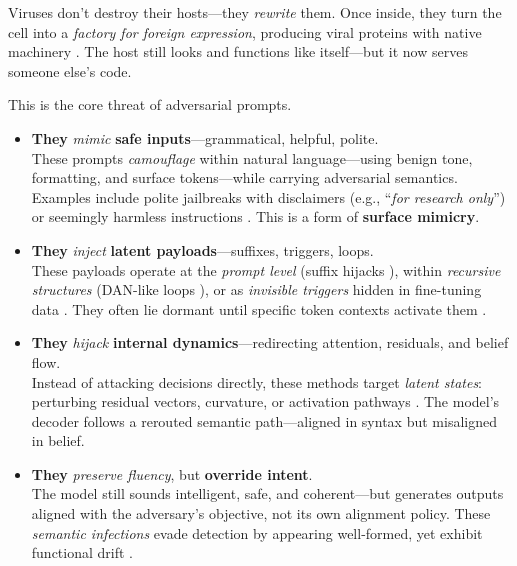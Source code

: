 
Viruses don’t destroy their hosts—they \emph{rewrite} them. Once inside, they turn the cell into a \textit{factory for foreign expression}, producing viral proteins with native machinery \cite{cohen2000control, tripathi2015host}. The host still looks and functions like itself—but it now serves someone else’s code.

This is the core threat of adversarial prompts.

\begin{itemize}[leftmargin=1em]

    \item \textbf{They} \textit{mimic} \textbf{safe inputs}—grammatical, helpful, polite.\\
    These prompts \emph{camouflage} within natural language—using benign tone, formatting, and surface tokens—while carrying adversarial semantics. Examples include polite jailbreaks with disclaimers (e.g., “\textit{for research only}”) or seemingly harmless instructions \cite{zou2023universal, liu2023jailbreaking, shi2023bad, lee2024alkali}. This is a form of \textbf{surface mimicry}.

    \item \textbf{They} \textit{inject} \textbf{latent payloads}—suffixes, triggers, loops.\\
    These payloads operate at the \emph{prompt level} (suffix hijacks \cite{zhu2024suffix, sun2024lowrank}), within \emph{recursive structures} (DAN-like loops \cite{chen2023you}), or as \emph{invisible triggers} hidden in fine-tuning data \cite{kurita2020weight, qi2021mind}. They often lie dormant until specific token contexts activate them \cite{yu2024promptfusion}.

    \item \textbf{They} \textit{hijack} \textbf{internal dynamics}—redirecting attention, residuals, and belief flow.\\
    Instead of attacking decisions directly, these methods target \emph{latent states}: perturbing residual vectors, curvature, or activation pathways \cite{li2024tokenpatch, xu2024eval, lee2024alkali}. The model’s decoder follows a rerouted semantic path—aligned in syntax but misaligned in belief.

    \item \textbf{They} \textit{preserve fluency}, but \textbf{override intent}.\\
    The model still sounds intelligent, safe, and coherent—but generates outputs aligned with the adversary’s objective, not its own alignment policy. These \emph{semantic infections} evade detection by appearing well-formed, yet exhibit functional drift \cite{carlini2023extracting, qin2023dan, deng2023attacks, zhou2023deseeder}.

\end{itemize}



